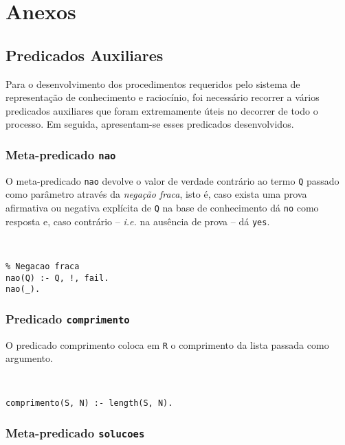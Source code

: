 \section{Anexos}

\subsection{Predicados Auxiliares}
\label{sec:aux}

Para o desenvolvimento dos procedimentos requeridos pelo sistema de representação de conhecimento 
e raciocínio, foi necessário recorrer a vários predicados auxiliares que
foram extremamente úteis no decorrer de todo o processo.
Em seguida, apresentam-se esses predicados desenvolvidos.

\subsubsection*{Meta-predicado \texttt{nao}}

O meta-predicado \texttt{nao} devolve o valor de verdade contrário ao termo \texttt{Q}
passado como parâmetro através da \textit{negação fraca}, isto é, caso exista uma prova 
afirmativa
ou negativa explícita de \texttt{Q} na base de conhecimento dá \texttt{no} como resposta e, caso 
contrário -- \textit{i.e.} na ausência de prova -- dá \texttt{yes}.

\

\begin{lstlisting}[caption={Extensão do meta-predicado \texttt{nao}}]
% Extensao do meta-predicado nao: Questao -> {V, F}
% Negacao fraca
nao(Q) :- Q, !, fail.
nao(_).
\end{lstlisting}

\subsubsection*{Predicado \texttt{comprimento}}

O predicado comprimento coloca em \texttt{R} o comprimento da lista passada como argumento.

\

\begin{lstlisting}[caption={Extensão do predicado \texttt{comprimento}}]
% Extensao do predicado comprimento: S, N -> {V, F}
comprimento(S, N) :- length(S, N).
\end{lstlisting}

\subsubsection*{Meta-predicado \texttt{solucoes}}

